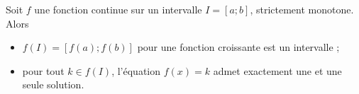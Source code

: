 \documentclass[12pt,frenchb]{beamer}
\begin{document}
\begin{frame}
  \begin{block}{}
    \begin{theorem}
      Soit $f$ une fonction continue sur un intervalle $I = [a;b]$,
      \alert{strictement monotone}. Alors
      \begin{itemize}
        \item $f(I) = [f(a);f(b)]$ pour une fonction croissante est un
          intervalle ;
        \item pour tout $k \in f(I)$, l'équation $f(x) = k$ admet exactement
          \alert{une et une seule} solution.
      \end{itemize}
    \end{theorem}
  \end{block}
\end{frame}
\end{document}
